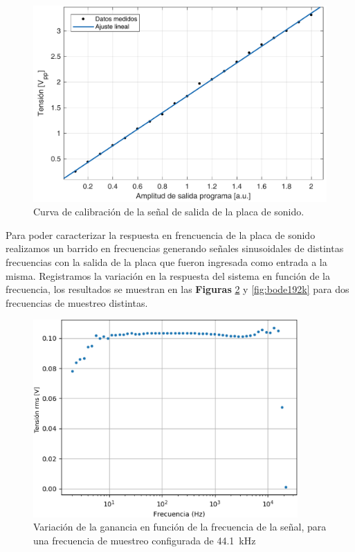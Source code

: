 \documentclass[a4paper,11pt]{article}
\begin{document}
	\begin{figure}[!h]
		\centering
		\includegraphics[width=\textwidth]{imagenes/CalibracionSalida.pdf}
		\caption{Curva de calibración de la señal de salida de la placa
de sonido.}
        \label{fig:CalibracionSalida}
	\end{figure}

Para poder caracterizar la respuesta en frencuencia de la placa de
sonido realizamos un barrido en frecuencias generando señales
sinusoidales de distintas frecuencias con la salida de la placa que
fueron ingresada como entrada a la misma. Registramos la variación en la
respuesta del sistema en función de la frecuencia, los resultados se
muestran en las \textbf{Figuras} \ref{fig:bode44k1} y \ref{fig:bode192k}
para dos frecuencias de muestreo distintas.

	\begin{figure}[!h]
		\centering
		\includegraphics[width=0.9\textwidth]{imagenes/bode44k1Hz.png}
		\caption{Variación de la ganancia en función de la frecuencia de
la señal, para una frecuencia de muestreo configurada de \SI{44.1}{\kHz}}
        \label{fig:bode44k1}
	\end{figure}
\end{document}
